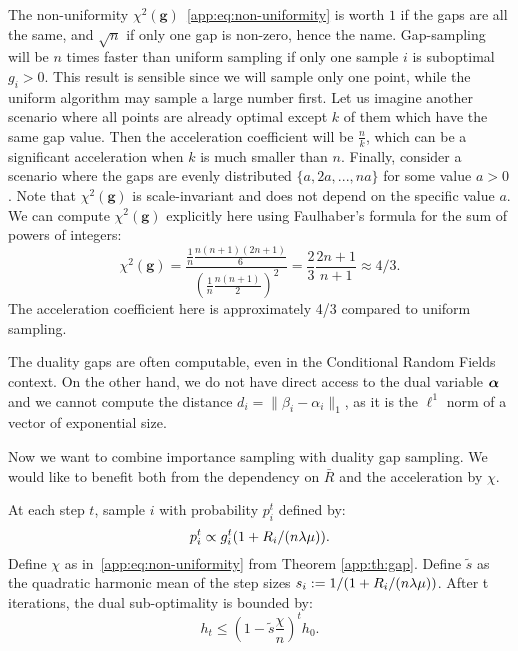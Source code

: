 \begin{subappendices}
	The non-uniformity $\chi^2(\bm g)$~\eqref{app:eq:non-uniformity} is worth $1$ if the gaps
	are all the same, and $\sqrt n$ if only one gap is non-zero, hence the name.
	Gap-sampling will be $n$ times faster than uniform sampling if only one sample $i$ is suboptimal $g_i>0$.
	This result is sensible since we will sample only one point, while the uniform algorithm may sample a large number first.
	Let us imagine another scenario where all points are already optimal except $k$ of them which have the same gap value.
	Then the acceleration coefficient will be $\frac{n}{k}$, which can be a significant acceleration when $k$ is much smaller than $n$.
	Finally, consider a scenario where the gaps are evenly distributed $\{a, 2a, ..., n a\}$ for some value $a > 0$.
	Note that $\chi^2(\bm g)$ is scale-invariant and does not depend on the specific value $a$.
	We can compute $\chi^2(\bm g)$ explicitly here using Faulhaber's formula for the sum of powers of integers:
	\begin{equation*}
		\chi^2(\bm g) = \frac{\frac{1}{n} \frac{n(n+1)(2n+1)}{6}}{\left(\frac{1}{n}\frac{n(n+1)}{2}\right)^2} = \frac{2}{3} \frac{2n+1}{n+1} \approx 4/3.
	\end{equation*}
	The acceleration coefficient here is approximately 4/3 compared to uniform sampling.
	
	The duality gaps are often computable, even in the Conditional Random Fields context.
	On the other hand, we do not have direct access to the dual variable $\boldsymbol{\alpha}$
	and we cannot compute the distance $d_i = \| \beta_i - \alpha_i \|_1$, as it is the $\ell^1$ norm of a vector of exponential size.
	
	Now we want to combine importance sampling with duality gap sampling.
	We would like to benefit both from the dependency on $\bar R$ and the acceleration by $\chi$.
	
	\begin{theorem}
		\label{app:th:gap+}
		At each step $t$, sample $i$ with probability $p_i^t$ defined by:
		\begin{equation}
			p_i^t \propto g_i^t (1+ R_i/(n \lambda \mu)).
		\end{equation}
		Define $\chi$ as in~\eqref{app:eq:non-uniformity} from Theorem \ref{app:th:gap}.
		Define $\tilde s$ as the quadratic harmonic mean of the step sizes $s_i := 1/(1+ R_i/(n \lambda \mu))$.
		After t iterations, the dual sub-optimality is bounded by:
		\begin{equation}
			h_t \leq (1-\tilde s \frac{\chi}{n})^t  h_0.
		\end{equation}
	\end{theorem}
	

\end{subappendices}
